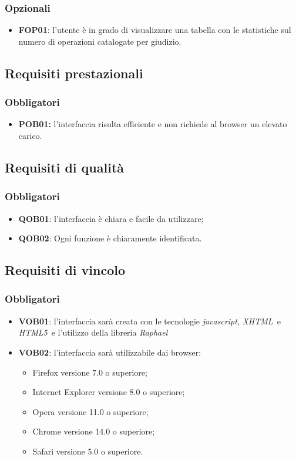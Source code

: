 \subsubsection{Opzionali}
\begin{itemize}
\item \textbf{FOP01}: l'utente è in grado di visualizzare una tabella con le statistiche sul numero di operazioni catalogate per giudizio.
\end{itemize}
\subsection{Requisiti prestazionali}
\subsubsection{Obbligatori}
\begin{itemize}
\item \textbf{POB01:} l'interfaccia risulta efficiente e non richiede al browser un elevato carico.
\end{itemize}
\subsection{Requisiti di qualità}
\subsubsection{Obbligatori}
\begin{itemize}
\item \textbf{QOB01}: l'interfaccia è chiara e facile da utilizzare;
\item \textbf{QOB02}: Ogni funzione è chiaramente identificata.
\end{itemize}
\subsection{Requisiti di vincolo}
\subsubsection{Obbligatori}
\begin{itemize}
\item \textbf{VOB01}: l'interfaccia sarà creata con le tecnologie \textit{javascript}, \textit{XHTML}\ e \textit{HTML5}\ e l'utilizzo della libreria \textit{Raphael}
\item \textbf{VOB02}: l'interfaccia sarà utilizzabile dai browser:
\begin{itemize}
\item Firefox versione 7.0 o superiore;
\item Internet Explorer versione 8.0 o superiore;
\item Opera versione 11.0 o superiore;
\item Chrome versione 14.0 o superiore;
\item Safari versione 5.0 o superiore.
\end{itemize}
\end{itemize}
\newpage
